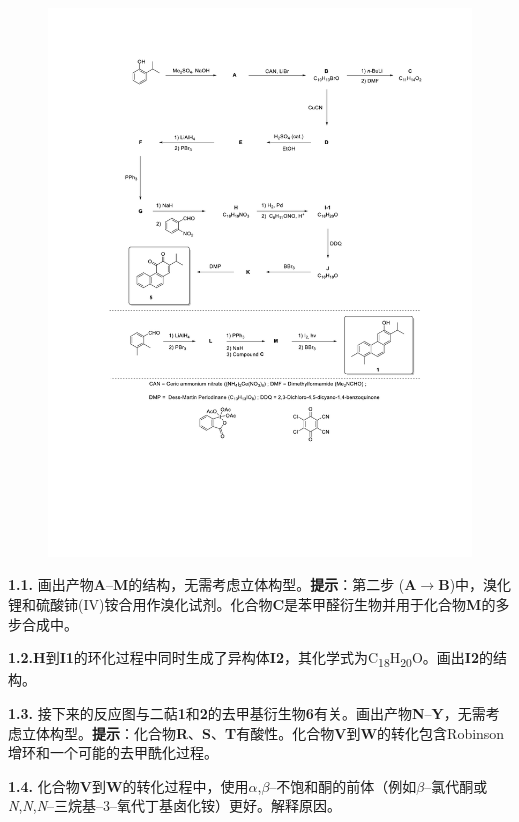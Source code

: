 \begin{figure}[h]
	\centering
	\includegraphics[width=16cm]{./pic/t1-3.pdf}
\end{figure}

\noindent\textbf{1.1.} 画出产物\textbf{A}--\textbf{M}的结构，无需考虑立体构型。\textbf{提示}：第二步 (\textbf{A}$\rightarrow$\textbf{B})中，溴化锂和硫酸铈(IV)铵合用作溴化试剂。化合物\textbf{C}是苯甲醛衍生物并用于化合物\textbf{M}的多步合成中。

\noindent\textbf{1.2.}\textbf{H}到\textbf{I1}的环化过程中同时生成了异构体\textbf{I2}，其化学式为C\textsubscript{18}H\textsubscript{20}O。画出\textbf{I2}的结构。

\noindent\textbf{1.3.} 接下来的反应图与二萜\textbf{1}和\textbf{2}的去甲基衍生物\textbf{6}有关。画出产物\textbf{N}--\textbf{Y}，无需考虑立体构型。\textbf{提示}：化合物\textbf{R}、\textbf{S}、\textbf{T}有酸性。化合物\textbf{V}到\textbf{W}的转化包含Robinson增环和一个可能的去甲酰化过程。

\noindent\textbf{1.4.} 化合物\textbf{V}到\textbf{W}的转化过程中，使用$\alpha$,$\beta$--不饱和酮的前体（例如$\beta$--氯代酮或\emph{N},\emph{N},\emph{N}--三烷基--3--氧代丁基卤化铵）更好。解释原因。

